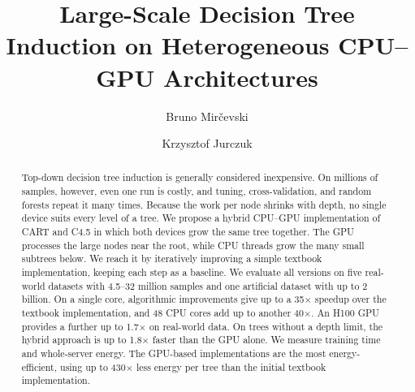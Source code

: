 \documentclass[runningheads]{llncs}
\begin{document}
%
\title{Large-Scale Decision Tree Induction on Heterogeneous CPU--GPU Architectures}
%
\author{Bruno Mirčevski \and Krzysztof Jurczuk}
%
\maketitle
%

\begin{abstract}
Top-down decision tree induction is generally considered inexpensive. On millions of samples, however, even one run is costly, and tuning, cross-validation, and random forests repeat it many times. Because the work per node shrinks with depth, no single device suits every level of a tree. We propose a hybrid CPU--GPU implementation of CART and C4.5 in which both devices grow the same tree together. The GPU processes the large nodes near the root, while CPU threads grow the many small subtrees below. We reach it by iteratively improving a simple textbook implementation, keeping each step as a baseline. We evaluate all versions on five real-world datasets with 4.5--32 million samples and one artificial dataset with up to 2 billion. On a single core, algorithmic improvements give up to a 35$\times$ speedup over the textbook implementation, and 48 CPU cores add up to another 40$\times$. An H100 GPU provides a further up to 1.7$\times$ on real-world data. On trees without a depth limit, the hybrid approach is up to 1.8$\times$ faster than the GPU alone. We measure training time and whole-server energy. The GPU-based implementations are the most energy-efficient, using up to 430$\times$ less energy per tree than the initial textbook implementation.

\end{abstract}
%









\end{document}

